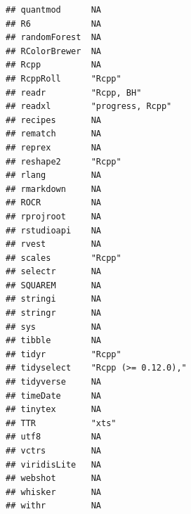 \documentclass[]{article}
\begin{document}
\begin{verbatim}
## quantmod      NA                                                   
## R6            NA                                                   
## randomForest  NA                                                   
## RColorBrewer  NA                                                   
## Rcpp          NA                                                   
## RcppRoll      "Rcpp"                                               
## readr         "Rcpp, BH"                                           
## readxl        "progress, Rcpp"                                     
## recipes       NA                                                   
## rematch       NA                                                   
## reprex        NA                                                   
## reshape2      "Rcpp"                                               
## rlang         NA                                                   
## rmarkdown     NA                                                   
## ROCR          NA                                                   
## rprojroot     NA                                                   
## rstudioapi    NA                                                   
## rvest         NA                                                   
## scales        "Rcpp"                                               
## selectr       NA                                                   
## SQUAREM       NA                                                   
## stringi       NA                                                   
## stringr       NA                                                   
## sys           NA                                                   
## tibble        NA                                                   
## tidyr         "Rcpp"                                               
## tidyselect    "Rcpp (>= 0.12.0),"                                  
## tidyverse     NA                                                   
## timeDate      NA                                                   
## tinytex       NA                                                   
## TTR           "xts"                                                
## utf8          NA                                                   
## vctrs         NA                                                   
## viridisLite   NA                                                   
## webshot       NA                                                   
## whisker       NA                                                   
## withr         NA                                                   

\end{verbatim}
\end{document}
